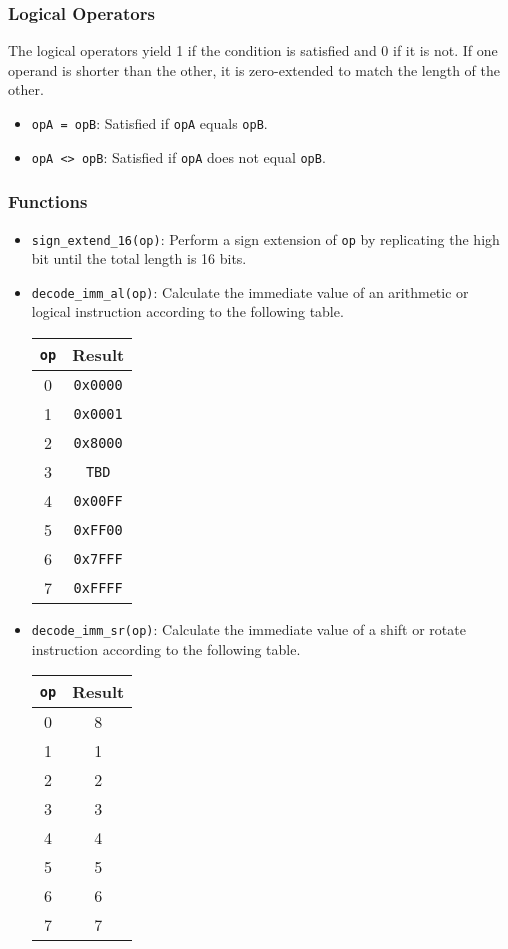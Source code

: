 \documentclass[12pt,a4paper]{article}
\begin{document}
\subsubsection{Logical Operators}
The logical operators yield 1 if the condition is satisfied and 0 if it is not. If one operand is shorter than the other, it is zero-extended to match the length of the other.

\begin{itemize}
  \item \texttt{opA = opB}: Satisfied if \texttt{opA} equals \texttt{opB}.
  \item \texttt{opA <> opB}: Satisfied if \texttt{opA} does not equal \texttt{opB}.
\end{itemize}

\subsubsection{Functions}

\begin{itemize}
  \item \texttt{sign\_extend\_16(op)}: Perform a sign extension of \texttt{op} by replicating the high bit until the total length is 16 bits.
  \item \texttt{decode\_imm\_al(op)}: Calculate the immediate value of an arithmetic or logical instruction according to the following table.\linebreak
    \begin{tabular}{|c c|}
    \hline
    \texttt{op} & Result \\
    \hline
    0 & \texttt{0x0000} \\
    1 & \texttt{0x0001} \\
    2 & \texttt{0x8000} \\
    3 & \texttt{TBD} \\
    4 & \texttt{0x00FF} \\
    5 & \texttt{0xFF00} \\
    6 & \texttt{0x7FFF} \\
    7 & \texttt{0xFFFF} \\
    \hline
    \end{tabular}
  \item \texttt{decode\_imm\_sr(op)}: Calculate the immediate value of a shift or rotate instruction according to the following table.\linebreak
    \begin{tabular}{|c c|}
    \hline
    \texttt{op} & Result \\
    \hline
    0 & 8 \\
    1 & 1 \\
    2 & 2 \\
    3 & 3 \\
    4 & 4 \\
    5 & 5 \\
    6 & 6 \\
    7 & 7 \\
    \hline
    \end{tabular}
\end{itemize}
\end{document}
